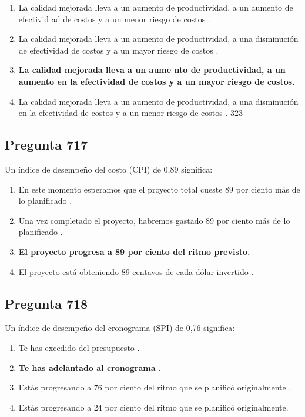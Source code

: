 \documentclass[11pt,a4paper]{article}
\begin{document}
\begin{enumerate}[label=\alph*)]
  \item La calidad mejorada lleva a un aumento de productividad, a un aumento de efectivid ad de costos y a un menor riesgo de costos .
  \item La calidad mejorada lleva a un aumento de productividad, a una disminución de efectividad de costos y a un mayor riesgo de costos .
  \item \textbf{La calidad mejorada lleva a un aume nto de productividad, a un aumento en la efectividad de costos y a un mayor riesgo de costos.}
  \item La calidad mejorada lleva a un aumento de productividad, a una disminución en la efectividad de costos y a un menor riesgo de costos . 323
\end{enumerate}

\subsection*{Pregunta 717}
Un índice de desempeño del costo (CPI) de 0,89 significa:

\begin{enumerate}[label=\alph*)]
  \item En este momento esperamos que el proyecto total cueste 89 por ciento más de lo planificado .
  \item Una vez completado el proyecto, habremos gastado 89 por ciento más de lo planificado .
  \item \textbf{El proyecto progresa a 89 por ciento del ritmo previsto.}
  \item El proyecto está obteniendo 89 centavos de cada dólar invertido .
\end{enumerate}

\subsection*{Pregunta 718}
Un índice de desempeño del cronograma (SPI) de 0,76 significa:

\begin{enumerate}[label=\alph*)]
  \item Te has excedido del presupuesto .
  \item \textbf{Te has adelantado al cronograma .}
  \item Estás progresando a 76 por ciento del ritmo que se planificó originalmente .
  \item Estás progresando a 24 por ciento del ritmo que se planificó originalmente.
\end{enumerate}
\end{document}
